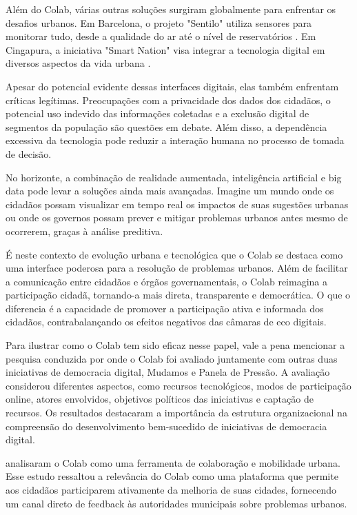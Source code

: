Além do Colab, várias outras soluções surgiram globalmente para enfrentar os desafios urbanos. Em Barcelona, o projeto "Sentilo" utiliza sensores para monitorar tudo, desde a qualidade do ar até o nível de reservatórios \cite{2016_Sinaee_IP}. Em Cingapura, a iniciativa "Smart Nation" visa integrar a tecnologia digital em diversos aspectos da vida urbana \cite{2016_Chia_IP}.

Apesar do potencial evidente dessas interfaces digitais, elas também enfrentam críticas legítimas. Preocupações com a privacidade dos dados dos cidadãos, o potencial uso indevido das informações coletadas e a exclusão digital de segmentos da população são questões em debate. Além disso, a dependência excessiva da tecnologia pode reduzir a interação humana no processo de tomada de decisão.

No horizonte, a combinação de realidade aumentada, inteligência artificial e big data pode levar a soluções ainda mais avançadas. Imagine um mundo onde os cidadãos possam visualizar em tempo real os impactos de suas sugestões urbanas ou onde os governos possam prever e mitigar problemas urbanos antes mesmo de ocorrerem, graças à análise preditiva.

É neste contexto de evolução urbana e tecnológica que o Colab se destaca como uma interface poderosa para a resolução de problemas urbanos. Além de facilitar a comunicação entre cidadãos e órgãos governamentais, o Colab reimagina a participação cidadã, tornando-a mais direta, transparente e democrática. O que o diferencia é a capacidade de promover a participação ativa e informada dos cidadãos, contrabalançando os efeitos negativos das câmaras de eco digitais.

Para ilustrar como o Colab tem sido eficaz nesse papel, vale a pena mencionar a pesquisa conduzida por  onde o Colab foi avaliado juntamente com outras duas iniciativas de democracia digital, Mudamos e Panela de Pressão. A avaliação considerou diferentes aspectos, como recursos tecnológicos, modos de participação online, atores envolvidos, objetivos políticos das iniciativas e captação de recursos. Os resultados destacaram a importância da estrutura organizacional na compreensão do desenvolvimento bem-sucedido de iniciativas de democracia digital.

 analisaram o Colab como uma ferramenta de colaboração e mobilidade urbana. Esse estudo ressaltou a relevância do Colab como uma plataforma que permite aos cidadãos participarem ativamente da melhoria de suas cidades, fornecendo um canal direto de feedback às autoridades municipais sobre problemas urbanos.

